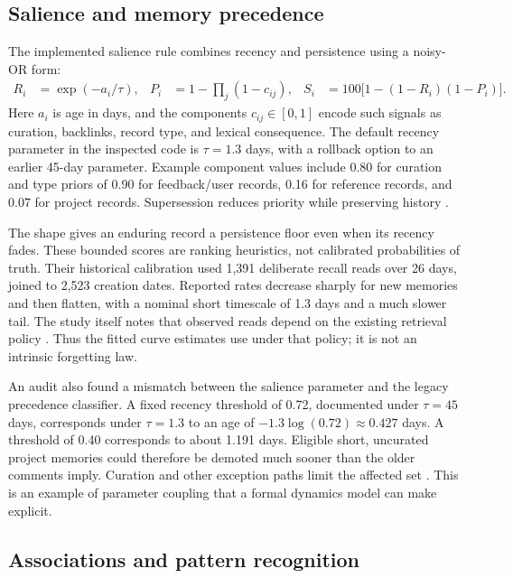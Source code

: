 

\subsection{Salience and memory precedence}

The implemented salience rule combines recency and persistence using a noisy-OR form:
\begin{align}
R_i &= \exp(-a_i/\tau),&
P_i &= 1-\prod_j(1-c_{ij}),&
S_i &= 100\bigl[1-(1-R_i)(1-P_i)\bigr].
\label{eq:salience}
\end{align}
Here $a_i$ is age in days, and the components $c_{ij}\in[0,1]$ encode such signals as curation, backlinks, record type, and lexical consequence. The default recency parameter in the inspected code is $\tau=1.3$ days, with a rollback option to an earlier 45-day parameter. Example component values include 0.80 for curation and type priors of 0.90 for feedback/user records, 0.16 for reference records, and 0.07 for project records. Supersession reduces priority while preserving history \citep{salience}.

The shape gives an enduring record a persistence floor even when its recency fades. These bounded scores are ranking heuristics, not calibrated probabilities of truth. Their historical calibration used 1,391 deliberate recall reads over 26 days, joined to 2,523 creation dates. Reported rates decrease sharply for new memories and then flatten, with a nominal short timescale of 1.3 days and a much slower tail. The study itself notes that observed reads depend on the existing retrieval policy \citep{recency}. Thus the fitted curve estimates use under that policy; it is not an intrinsic forgetting law.

An audit also found a mismatch between the salience parameter and the legacy precedence classifier. A fixed recency threshold of 0.72, documented under $\tau=45$ days, corresponds under $\tau=1.3$ to an age of $-1.3\log(0.72)\approx0.427$ days. A threshold of 0.40 corresponds to about 1.191 days. Eligible short, uncurated project memories could therefore be demoted much sooner than the older comments imply. Curation and other exception paths limit the affected set \citep{consciousnesscode,salience}. This is an example of parameter coupling that a formal dynamics model can make explicit.

\subsection{Associations and pattern recognition}

